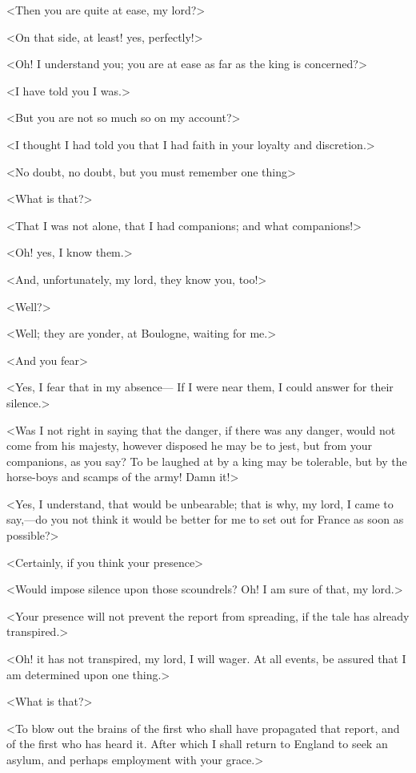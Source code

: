 <Then you are quite at ease, my lord?>

<On that side, at least! yes, perfectly!>

<Oh! I understand you; you are at ease as far as the king is concerned?>

<I have told you I was.>

<But you are not so much so on my account?>

<I thought I had told you that I had faith in your loyalty and discretion.>

<No doubt, no doubt, but you must remember one thing\longdash>

<What is that?>

<That I was not alone, that I had companions; and what companions!>

<Oh! yes, I know them.>

<And, unfortunately, my lord, they know you, too!>

<Well?>

<Well; they are yonder, at Boulogne, waiting for me.>

<And you fear\longdash>

<Yes, I fear that in my absence— If I were near them, I could answer for their silence.>

<Was I not right in saying that the danger, if there was any danger, would not come from his majesty, however disposed he may be to jest, but from your companions, as you say? To be laughed at by a king may be tolerable, but by the horse-boys and scamps of the army! Damn it!>

<Yes, I understand, that would be unbearable; that is why, my lord, I came to say,—do you not think it would be better for me to set out for France as soon as possible?>

<Certainly, if you think your presence\longdash>

<Would impose silence upon those scoundrels? Oh! I am sure of that, my lord.>

<Your presence will not prevent the report from spreading, if the tale has already transpired.>

<Oh! it has not transpired, my lord, I will wager. At all events, be assured that I am determined upon one thing.>

<What is that?>

<To blow out the brains of the first who shall have propagated that report, and of the first who has heard it. After which I shall return to England to seek an asylum, and perhaps employment with your grace.>

